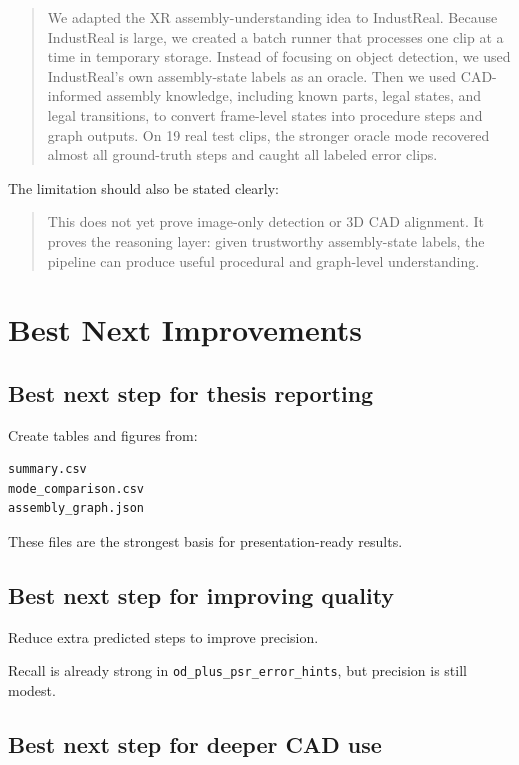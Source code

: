 \documentclass[11pt,a4paper]{article}
\begin{document}
\begin{quote}
We adapted the XR assembly-understanding idea to IndustReal. Because IndustReal is large, we created a batch runner that processes one clip at a time in temporary storage. Instead of focusing on object detection, we used IndustReal's own assembly-state labels as an oracle. Then we used CAD-informed assembly knowledge, including known parts, legal states, and legal transitions, to convert frame-level states into procedure steps and graph outputs. On 19 real test clips, the stronger oracle mode recovered almost all ground-truth steps and caught all labeled error clips.
\end{quote}

The limitation should also be stated clearly:

\begin{quote}
This does not yet prove image-only detection or 3D CAD alignment. It proves the reasoning layer: given trustworthy assembly-state labels, the pipeline can produce useful procedural and graph-level understanding.
\end{quote}

\section{Best Next Improvements}

\subsection{Best next step for thesis reporting}

Create tables and figures from:

\begin{lstlisting}
summary.csv
mode_comparison.csv
assembly_graph.json
\end{lstlisting}

These files are the strongest basis for presentation-ready results.

\subsection{Best next step for improving quality}

Reduce extra predicted steps to improve precision.

Recall is already strong in \texttt{od\_plus\_psr\_error\_hints}, but precision is still modest.

\subsection{Best next step for deeper CAD use}
\end{document}
